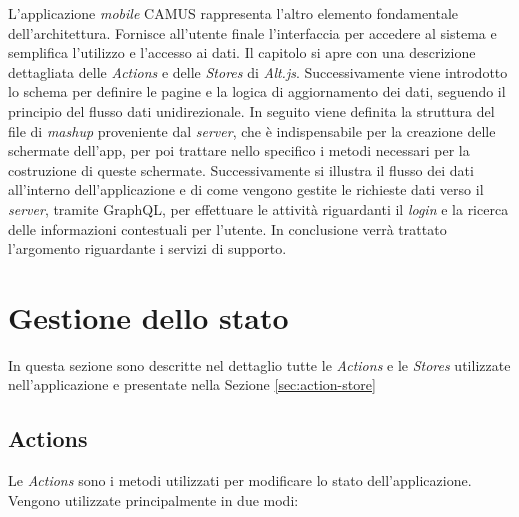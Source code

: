 L'applicazione \emph{mobile} CAMUS rappresenta l'altro elemento fondamentale dell'ar\-chi\-tet\-tu\-ra. Fornisce all'utente finale l'interfaccia per accedere al sistema e semplifica l'utilizzo e l'accesso ai dati. Il capitolo si apre con una descrizione dettagliata delle \emph{Actions} e delle \emph{Stores} di \emph{Alt.js}.
%
Successivamente viene introdotto lo schema per definire le pagine e la logica di aggiornamento dei dati, seguendo il principio del flusso dati unidirezionale. In seguito viene definita la struttura del file di \emph{mashup} proveniente dal \emph{server}, che è indispensabile per la creazione delle schermate dell'app, per poi trattare nello specifico i metodi necessari per la costruzione di queste schermate.
Successivamente si illustra il flusso dei dati all'interno dell'applicazione e di come vengono gestite le richieste dati verso il \emph{server}, tramite GraphQL, per effettuare le attività riguardanti il \emph{login} e la ricerca delle informazioni contestuali per l'utente. In conclusione verrà trattato l'argomento riguardante i servizi di supporto.

\section{Gestione dello stato}\label{sec:state-management}
In questa sezione sono descritte nel dettaglio tutte le \emph{Actions} e le \emph{Stores} utilizzate nell'applicazione e presentate nella Sezione \ref{sec:action-store}

\subsection{Actions\label{sec:actions}}

Le \emph{Actions} sono i metodi utilizzati per modificare lo stato dell'ap\-pli\-ca\-zio\-ne. Vengono utilizzate principalmente in due modi:

